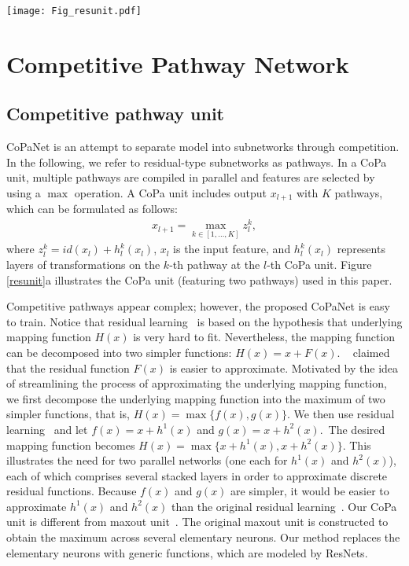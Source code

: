 \documentclass[wcp]{jmlr}
\begin{document}
\begin{figure*}
\begin{center}
	\texttt{[image: Fig\_resunit.pdf]}
\end{center}
   \caption{The proposed CoPa unit and network architecture.}
\label{resunit}
\end{figure*}

\section{Competitive Pathway Network}
\subsection{Competitive pathway unit}
CoPaNet is an attempt to separate model into subnetworks through competition.
In the following, we refer to residual-type subnetworks as pathways.
In a CoPa unit, multiple pathways are compiled in parallel and features are selected by using a $\max$ operation.
A CoPa unit includes output $x_{l+1}$ with $K$ pathways, which can be formulated as follows:
\begin{align*}
x_{l+1}=\mathop{\max }_{k\in [1,\ldots , K]} z_l^k,
\end{align*}
where $z_l^k=id(x_l)+h_l^k (x_l)$, $x_l$ is the input feature, and $h_l^k (x_l)$ represents layers of transformations on the $k$-th pathway at the $l$-th CoPa unit. Figure \ref{resunit}a illustrates the CoPa unit (featuring two pathways) used in this paper. 

Competitive pathways appear complex; however, the proposed CoPaNet is easy to train. 
Notice that residual learning~\citep{he2015deep} is based on the hypothesis that underlying mapping function $H(x)$ is very hard to fit.
Nevertheless, the mapping function can be decomposed into two simpler functions: $H(x)=x+F(x)$. 
~\cite{he2015deep} claimed that the residual function $F(x)$ is easier to approximate. 
Motivated by the idea of streamlining the process of approximating the underlying mapping function, we first decompose the underlying mapping function into the maximum of two simpler functions, that is, $H(x)=\max\{f(x),g(x)\}$. 
We then use residual learning~\citep{he2015deep} and let $f(x)=x+h^1 (x)$ and $g(x)=x+h^2 (x)$.\
The desired mapping function becomes $H(x)=\max\{x+h^1 (x),x+h^2 (x)\}$. 
This illustrates the need for two parallel networks (one each for $h^1(x)$ and $h^2(x)$), each of which comprises several stacked layers in order to approximate discrete residual functions. 
Because $f(x)$ and $g(x)$ are simpler, it would be easier to approximate $h^1 (x)$ and $h^2 (x)$ than the original residual learning~\citep{he2015deep}.
Our CoPa unit is different from maxout unit~\citep{goodfellow2013maxout}.
The original maxout unit is constructed to obtain the maximum across several elementary neurons.
 Our method replaces the elementary neurons with generic functions, which are modeled by ResNets.
\end{document}
